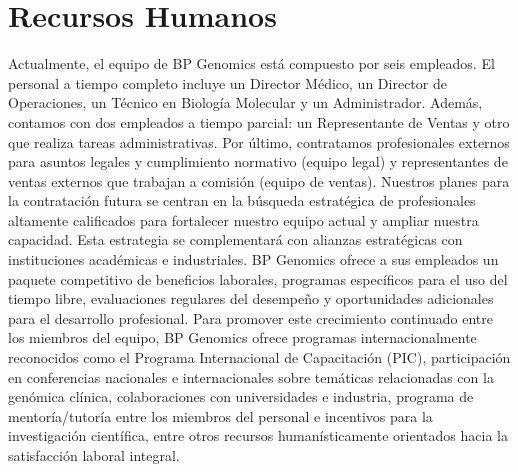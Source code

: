 \section{Recursos Humanos}\label{sec:recursos_humanos}
Actualmente, el equipo de BP Genomics está compuesto por seis empleados. El personal a tiempo completo incluye un Director Médico, un Director de Operaciones, un Técnico en Biología Molecular y un Administrador. Además, contamos con dos empleados a tiempo parcial: un Representante de Ventas y otro que realiza tareas administrativas. Por último, contratamos profesionales externos para asuntos legales y cumplimiento normativo (equipo legal) y representantes de ventas externos que trabajan a comisión (equipo de ventas).
Nuestros planes para la contratación futura se centran en la búsqueda estratégica de profesionales altamente calificados para fortalecer nuestro equipo actual y ampliar nuestra capacidad. Esta estrategia se complementará con alianzas estratégicas con instituciones académicas e industriales.
BP Genomics ofrece a sus empleados un paquete competitivo de beneficios laborales, programas específicos para el uso del tiempo libre, evaluaciones regulares del desempeño y oportunidades adicionales para el desarrollo profesional. Para promover este crecimiento continuado entre los miembros del equipo, BP Genomics ofrece programas internacionalmente reconocidos como el Programa Internacional de Capacitación (PIC), participación en conferencias nacionales e internacionales sobre temáticas relacionadas con la genómica clínica, colaboraciones con universidades e industria, programa de mentoría/tutoría entre los miembros del personal e incentivos para la investigación científica, entre otros recursos humanísticamente orientados hacia la satisfacción laboral integral.
